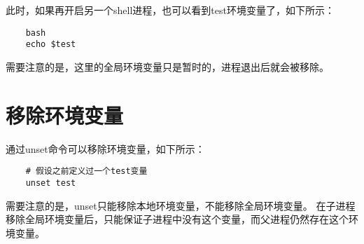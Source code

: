 \documentclass[a4paper,left=2.5cm,right=2.5cm,11pt]{article}
\begin{document}
	此时，如果再开启另一个shell进程，也可以看到test环境变量了，如下所示：
	\begin{lstlisting}
	bash
	echo $test
	\end{lstlisting}

	需要注意的是，这里的全局环境变量只是暂时的，进程退出后就会被移除。

\section{移除环境变量}
	通过unset命令可以移除环境变量，如下所示：
	\begin{lstlisting}
	# 假设之前定义过一个test变量
	unset test
	\end{lstlisting}

	需要注意的是，unset只能移除本地环境变量，不能移除全局环境变量。
	在子进程移除全局环境变量后，只能保证子进程中没有这个变量，而父进程仍然存在这个环境变量。
\end{document}
